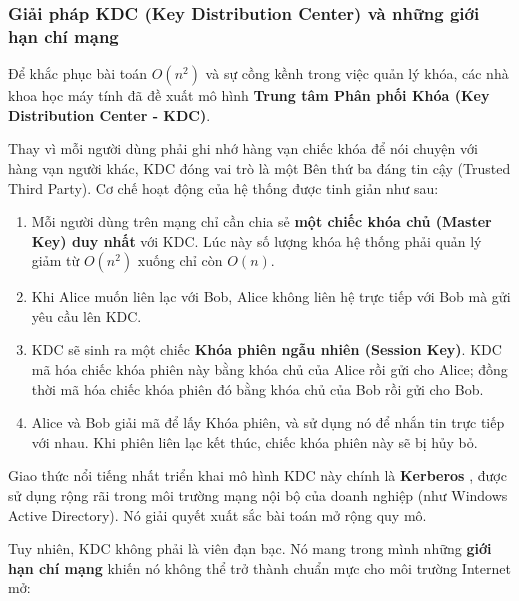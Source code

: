 \subsubsection*{Giải pháp KDC (Key Distribution Center) và những giới hạn chí mạng}

Để khắc phục bài toán $O(n^2)$ và sự cồng kềnh trong việc quản lý khóa, các nhà khoa học máy tính đã đề xuất mô hình \textbf{Trung tâm Phân phối Khóa (Key Distribution Center - KDC)}.

Thay vì mỗi người dùng phải ghi nhớ hàng vạn chiếc khóa để nói chuyện với hàng vạn người khác, KDC đóng vai trò là một Bên thứ ba đáng tin cậy (Trusted Third Party). Cơ chế hoạt động của hệ thống được tinh giản như sau:
\begin{enumerate}
    \item Mỗi người dùng trên mạng chỉ cần chia sẻ \textbf{một chiếc khóa chủ (Master Key) duy nhất} với KDC. Lúc này số lượng khóa hệ thống phải quản lý giảm từ $O(n^2)$ xuống chỉ còn $O(n)$.
    \item Khi Alice muốn liên lạc với Bob, Alice không liên hệ trực tiếp với Bob mà gửi yêu cầu lên KDC.
    \item KDC sẽ sinh ra một chiếc \textbf{Khóa phiên ngẫu nhiên (Session Key)}. KDC mã hóa chiếc khóa phiên này bằng khóa chủ của Alice rồi gửi cho Alice; đồng thời mã hóa chiếc khóa phiên đó bằng khóa chủ của Bob rồi gửi cho Bob.
    \item Alice và Bob giải mã để lấy Khóa phiên, và sử dụng nó để nhắn tin trực tiếp với nhau. Khi phiên liên lạc kết thúc, chiếc khóa phiên này sẽ bị hủy bỏ.
\end{enumerate}

Giao thức nổi tiếng nhất triển khai mô hình KDC này chính là \textbf{Kerberos} \cite{Steiner1988}, được sử dụng rộng rãi trong môi trường mạng nội bộ của doanh nghiệp (như Windows Active Directory). Nó giải quyết xuất sắc bài toán mở rộng quy mô.

Tuy nhiên, KDC không phải là viên đạn bạc. Nó mang trong mình những \textbf{giới hạn chí mạng} khiến nó không thể trở thành chuẩn mực cho môi trường Internet mở:


